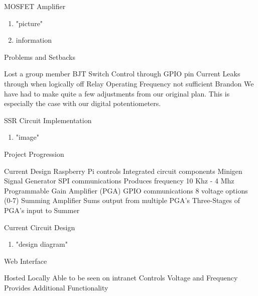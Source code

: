 \begin{frame}{MOSFET Amplifier}
  \begin{enumerate}
    \item "picture"
    \item information
  \end{enumerate}
\end{frame}

\begin{frame}{Problems and Setbacks}
  \begin{enumerate}
    Lost a group member
    BJT Switch
    Control through GPIO pin
    Current Leaks through when logically off
    Relay
    Operating Frequency not sufficient
    Brandon
    We have had to make quite a few adjustments from our original plan.
    This is especially the case with our digital potentiometers.
  \end{enumerate}
\end{frame}

\begin{frame}{SSR Circuit Implementation}
  \begin{enumerate}
    \item "image"
  \end{enumerate}
\end{frame}

\begin{frame}{Project Progression}
  \begin{enumerate}
    Current Design
    Raspberry Pi controls Integrated circuit components
    Minigen Signal Generator
    SPI communications
    Produces frequency 10 Khz - 4 Mhz
    Programmable Gain Amplifier (PGA)
    GPIO communications
    8 voltage options (0-7)
    Summing Amplifier
    Sums output from multiple PGA’s
    Three-Stages of PGA’s input to Summer
  \end{enumerate}
\end{frame}

\begin{frame}{Current Circuit Design}
  \begin{enumerate}
    \item "design diagram"
  \end{enumerate}
\end{frame}

\begin{frame}{Web Interface}
  \begin{enumerate}
    Hosted Locally
    Able to be seen on intranet
    Controls Voltage and Frequency
    Provides Additional Functionality
  \end{enumerate}
\end{frame}

